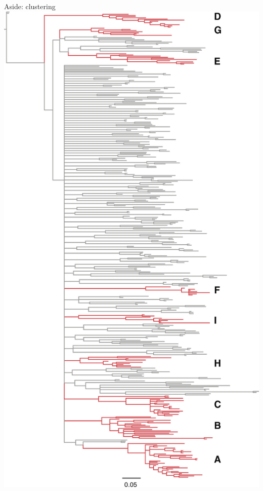 \documentclass{beamer}
\begin{document}
\begin{frame}{Aside: clustering}
    \includegraphics[trim=1in 0 0 4in, clip=true]{f3a}

\end{frame}
\end{document}

